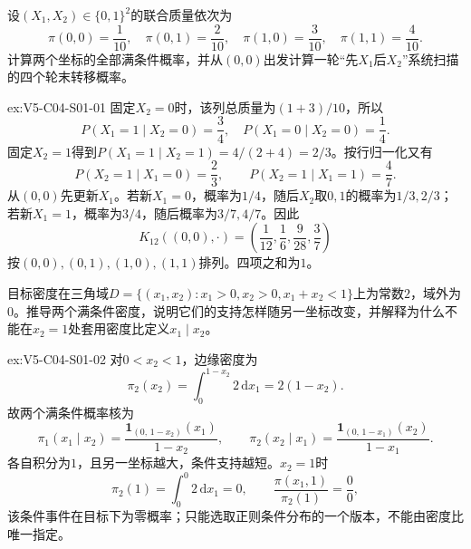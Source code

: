 \begin{SLChapterExercisePairSection}
\begin{exercise}\label{ex:V5-C04-S01-01}
设$(X_1,X_2)\in\{0,1\}^2$的联合质量依次为
\[
\pi(0,0)=\frac1{10},\quad
\pi(0,1)=\frac2{10},\quad
\pi(1,0)=\frac3{10},\quad
\pi(1,1)=\frac4{10}.
\]
计算两个坐标的全部满条件概率，并从$(0,0)$出发计算一轮“先$X_1$后$X_2$”系统扫描的四个轮末转移概率。
\end{exercise}
\ifSLFullEdition
{}\label{sol:V5-C04-S01-01}
\begin{chapterexercisesolution}{ex:V5-C04-S01-01}
固定$X_2=0$时，该列总质量为$(1+3)/10$，所以
\[
P(X_1=1\mid X_2=0)=\frac34,
\quad P(X_1=0\mid X_2=0)=\frac14.
\]
固定$X_2=1$得到$P(X_1=1\mid X_2=1)=4/(2+4)=2/3$。按行归一化又有
\[
P(X_2=1\mid X_1=0)=\frac23,
\qquad
P(X_2=1\mid X_1=1)=\frac47.
\]
从$(0,0)$先更新$X_1$。若新$X_1=0$，概率为$1/4$，随后$X_2$取$0,1$的概率为$1/3,2/3$；若新$X_1=1$，概率为$3/4$，随后概率为$3/7,4/7$。因此
\[
K_{12}((0,0),\cdot)
=\left(\frac1{12},\frac16,\frac9{28},\frac37\right)
\]
按$(0,0),(0,1),(1,0),(1,1)$排列。四项之和为$1$。
\end{chapterexercisesolution}
\fi

\begin{exercise}\label{ex:V5-C04-S01-02}
目标密度在三角域$D=\{(x_1,x_2):x_1>0,x_2>0,x_1+x_2<1\}$上为常数$2$，域外为$0$。推导两个满条件密度，说明它们的支持怎样随另一坐标改变，并解释为什么不能在$x_2=1$处套用密度比定义$x_1\mid x_2$。
\end{exercise}
\ifSLFullEdition
{}\label{sol:V5-C04-S01-02}
\begin{chapterexercisesolution}{ex:V5-C04-S01-02}
对$0<x_2<1$，边缘密度为
\[
\pi_2(x_2)=\int_0^{1-x_2}2\,\mathrm dx_1=2(1-x_2).
\]
故两个满条件概率核为
\[
\pi_1(x_1\mid x_2)
=\frac{\boldsymbol1_{(0,\,1-x_2)}(x_1)}{1-x_2},
\qquad
\pi_2(x_2\mid x_1)
=\frac{\boldsymbol1_{(0,\,1-x_1)}(x_2)}{1-x_1}.
\]
各自积分为$1$，且另一坐标越大，条件支持越短。$x_2=1$时
\[
\pi_2(1)=\int_0^0 2\,\mathrm dx_1=0,\qquad
\frac{\pi(x_1,1)}{\pi_2(1)}=\frac00,
\]
该条件事件在目标下为零概率；只能选取正则条件分布的一个版本，不能由密度比唯一指定。
\end{chapterexercisesolution}
\fi


\end{SLChapterExercisePairSection}
